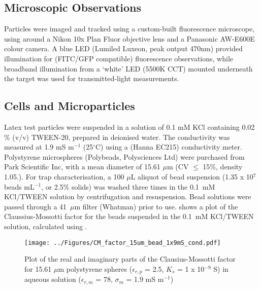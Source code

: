 
\subsection{Microscopic Observations}
Particles were imaged and tracked using a custom-built fluorescence microscope, using around a Nikon 10x Plan Fluor objective lens and a Panasonic AW-E600E colour camera. A blue LED (Lumiled Luxeon, peak output 470nm) provided illumination for (FITC/GFP compatible) fluorescence observations, while broadband illumination from a `white' LED (5500K CCT) mounted underneath the target was used for transmitted-light measurements. 

\subsection{Cells and Microparticles}
Latex test particles were suspended in a solution of 0.1 mM KCl containing 0.02 $\%$ (v/v) TWEEN-20, prepared in deionised water. The conductivity was measured at 1.9 mS m$^{-1}$ (25$^{\circ}$C) using a (Hanna EC215) conductivity meter. Polystyrene microspheres (Polybeads, Polysciences Ltd) were purchased from Park Scientific Inc, with a mean diameter of 15.61 $\mu$m (CV $\leq$ 15$\%$, density 1.05.). For trap characterisation, a 100 $\mu$L aliquot of bead suspension (1.35 x 10$^{7}$ beads mL$^{-1}$, or 2.5\% solids) was washed three times in the 0.1~mM KCl/TWEEN solution by centrifugation and resuspension. Bead solutions were passed through a 41~$\mu$m filter (Whatman) prior to use.  shows a plot of the Claussius-Mossotti factor for the beads suspended in the 0.1~mM KCl/TWEEN solution, calculated using .

\begin{figure}
	\centering
		\texttt{[image: ../Figures/CM\_factor\_15um\_bead\_1x9mS\_cond.pdf]}
	\caption[Plot of the Clausius-Mossotti factor for 15.61 $\mu$m polystyrene spheres in aqueous solution.]{Plot of the real and imaginary parts of the Clausius-Mossotti factor for 15.61 $\mu$m polystyrene spheres ($\epsilon_{r,p}$ = 2.5, $K_{s}$ = 1 x 10$^{-9}$ S) in aqueous solution ($\epsilon_{r,m}$ = 78, $\sigma_{m}$ = 1.9 mS m$^{-1}$)}
	\label{fig:CM_factor_15um_bead_1x9mS_cond}
\end{figure}

